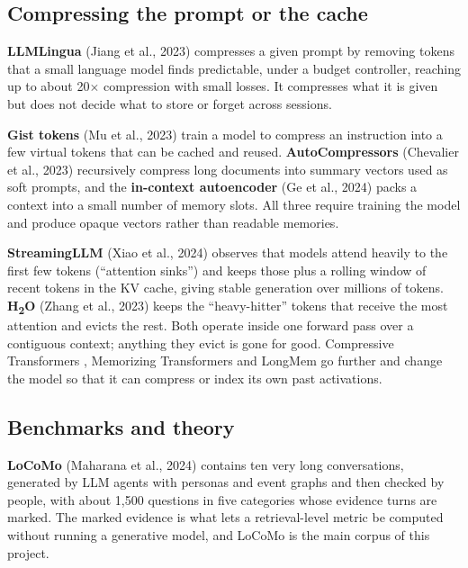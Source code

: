 \subsection{Compressing the prompt or the cache}

\textbf{LLMLingua} (Jiang et al., 2023) \cite{jiang2023llmlingua} compresses a
given prompt by removing tokens that a small language model finds predictable,
under a budget controller, reaching up to about 20$\times$ compression with
small losses. It compresses what it is given but does not decide what to
store or forget across sessions.

\textbf{Gist tokens} (Mu et al., 2023) \cite{mu2023gist} train a model to
compress an instruction into a few virtual tokens that can be cached and
reused. \textbf{AutoCompressors} (Chevalier et al., 2023)
\cite{chevalier2023autocompressor} recursively compress long documents into
summary vectors used as soft prompts, and the \textbf{in-context autoencoder}
(Ge et al., 2024) \cite{ge2024icae} packs a context into a small number of
memory slots. All three require training the model and produce opaque
vectors rather than readable memories.

\textbf{StreamingLLM} (Xiao et al., 2024) \cite{xiao2024streaming} observes
that models attend heavily to the first few tokens (``attention sinks'') and
keeps those plus a rolling window of recent tokens in the KV cache, giving
stable generation over millions of tokens. \textbf{H\textsubscript{2}O}
(Zhang et al., 2023) \cite{zhang2023h2o} keeps the ``heavy-hitter'' tokens that
receive the most attention and evicts the rest. Both operate inside one
forward pass over a contiguous context; anything they evict is gone for good.
Compressive Transformers \cite{rae2020compressive}, Memorizing Transformers
\cite{wu2022memorizing} and LongMem \cite{wang2023longmem} go further and
change the model so that it can compress or index its own past activations.

\subsection{Benchmarks and theory}

\textbf{LoCoMo} (Maharana et al., 2024) \cite{maharana2024locomo} contains ten
very long conversations, generated by LLM agents with personas and event
graphs and then checked by people, with about 1{,}500 questions in five
categories whose evidence turns are marked. The marked evidence is what lets
a retrieval-level metric be computed without running a generative model, and
LoCoMo is the main corpus of this project.

